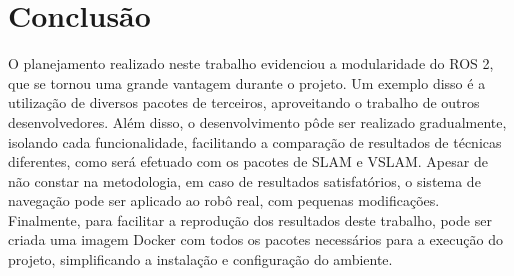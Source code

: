 \documentclass[repeatfields,xlists,xpacks,oneside,yearsonly]{ufrgscca}
\begin{document}
\chapter{Conclusão}
\label{conclusao}

O planejamento realizado neste trabalho evidenciou a modularidade do ROS 2,
que se tornou uma grande vantagem durante o projeto.
Um exemplo disso é a utilização de diversos pacotes de terceiros,
aproveitando o trabalho de outros desenvolvedores.
Além disso, o desenvolvimento pôde ser realizado gradualmente,
isolando cada funcionalidade, facilitando a comparação
de resultados de técnicas diferentes, como será efetuado com os pacotes de SLAM
e VSLAM.
Apesar de não constar na metodologia, em caso de resultados satisfatórios,
o sistema de navegação pode ser aplicado ao robô real, com pequenas
modificações.
Finalmente, para facilitar a reprodução dos resultados deste trabalho,
pode ser criada uma imagem Docker com todos os pacotes necessários para
a execução do projeto, simplificando a instalação e configuração do ambiente.


\printbibliography

%
%
%
\end{document}

